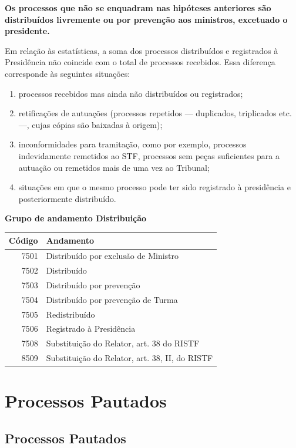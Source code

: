 \documentclass[
]{book}
\begin{document}
\textbf{Os processos que não se enquadram nas hipóteses anteriores são distribuídos livremente ou por prevenção aos ministros, excetuado o presidente.}

Em relação às estatísticas, a soma dos processos distribuídos e registrados à Presidência não coincide com o total de processos recebidos. Essa diferença corresponde às seguintes situações:

\begin{enumerate}
\def\labelenumi{\arabic{enumi}.}
\item
  processos recebidos mas ainda não distribuídos ou registrados;
\item
  retificações de autuações (processos repetidos --- duplicados, triplicados etc. ---, cujas cópias são baixadas à origem);
\item
  inconformidades para tramitação, como por exemplo, processos indevidamente remetidos ao STF, processos sem peças suficientes para a autuação ou remetidos mais de uma vez ao Tribunal;
\item
  situações em que o mesmo processo pode ter sido registrado à presidência e posteriormente distribuído.
\end{enumerate}

\textbf{Grupo de andamento Distribuição}

\begin{tabular}{r|l}
\hline
Código & Andamento\\
\hline
7501 & Distribuído por exclusão de Ministro\\
\hline
7502 & Distribuído\\
\hline
7503 & Distribuído por prevenção\\
\hline
7504 & Distribuído por prevenção de Turma\\
\hline
7505 & Redistribuído\\
\hline
7506 & Registrado à Presidência\\
\hline
7508 & Substituição do Relator, art. 38 do RISTF\\
\hline
8509 & Substituição do Relator, art. 38, II, do RISTF\\
\hline
\end{tabular}

\hypertarget{processos-pautados}{%
\chapter{Processos Pautados}\label{processos-pautados}}

\hypertarget{processos-pautados-1}{%
\section{Processos Pautados}\label{processos-pautados-1}}
\end{document}
